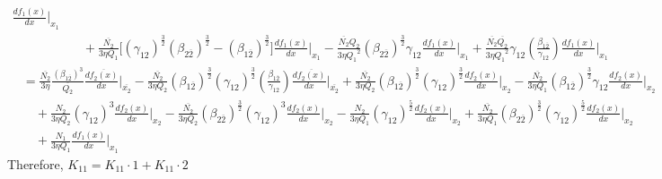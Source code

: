 \documentclass[fleqn, 10pt]{article}
\begin{document}
\begin{equation*}
\begin{split}
\frac{df_1(x)}{dx} \Bigg|_{x_1} \\ & \quad + \frac{\overline{N_2}}{3 \eta Q_1} \biggl[ (\gamma_{12})^\frac{3}{2} (\beta_{2\overline{2}})^\frac{3}{2} -   (\beta_{1\overline{2}})^\frac{3}{2} \biggr] \frac{df_1(x)}{dx} \Bigg|_{x_1}  -   \frac{\overline{N_2} Q_2}{3 \eta {Q_1}^2} (\beta_{2\overline{2}})^\frac{3}{2} \gamma_{12} \frac{df_1(x)}{dx} \Bigg|_{x_1} +   \frac{\overline{N_2} \overline{Q_2}}{3 \eta {Q_1}^2} \gamma_{12}  \left(\frac{\beta_{1\overline{2}}}{\gamma_{12}}\right) \frac{df_1(x)}{dx} \Bigg|_{x_1} 
            \end{split}
            \end{equation*}
            \begin{equation}
            \begin{split}
            &=   \frac{\overline{N_2}}{3 \eta} \frac{(\beta_{1\overline{2}})^3}{\overline{Q_2}} \frac{d\overline{f_2(x)}}{dx} \Bigg|_{\overline{x_2}} -    \frac{\overline{N_2}}{3 \eta Q_2} (\beta_{1\overline{2}})^\frac{3}{2} (\gamma_{12})^\frac{3}{2}  \left(\frac{\beta_{1\overline{2}}}{\gamma_{12}}\right) \frac{d\overline{f_2(x)}}{dx} \Bigg|_{\overline{x_2}} +   \frac{\overline{N_2}}{3 \eta Q_2} (\beta_{1\overline{2}})^\frac{3}{2} (\gamma_{12})^\frac{3}{2} \frac{df_2(x)}{dx} \Bigg|_{x_2} -    \frac{\overline{N_2}}{3 \eta Q_1} (\beta_{1\overline{2}})^\frac{3}{2} \gamma_{12} \frac{df_2(x)}{dx} \Bigg|_{x_2} \\ & \quad +  \frac{N_2}{3 \eta Q_2} (\gamma_{12})^3 \frac{df_2(x)}{dx} \Bigg|_{x_2} -   \frac{\overline{N_2}}{3 \eta Q_2} (\beta_{2\overline{2}})^\frac{3}{2} (\gamma_{12})^3 \frac{df_2(x)}{dx} \Bigg|_{x_2} -   \frac{N_2}{3 \eta Q_1} (\gamma_{12})^\frac{5}{2} \frac{df_2(x)}{dx} \Bigg|_{x_2} +   \frac{\overline{N_2}}{3 \eta Q_1} (\beta_{2\overline{2}})^\frac{3}{2} (\gamma_{12})^\frac{5}{2} \frac{df_2(x)}{dx} \Bigg|_{x_2} \\ & \quad +   \frac{N_1}{3 \eta Q_1} \frac{df_1(x)}{dx} \Bigg|_{x_1} 
            \end{split}
            \label{104}
            \end{equation}
            Therefore, $K_{11} = K_{11} \cdot 1 + K_{11} \cdot 2$
\end{document}
